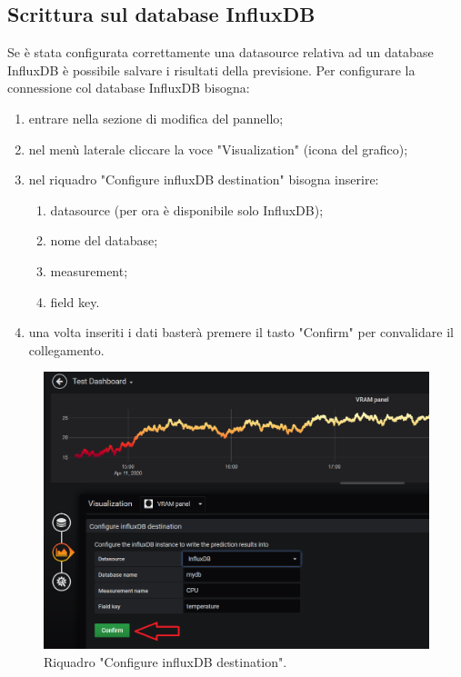     \subsection{Scrittura sul database InfluxDB}
        Se è stata configurata correttamente una datasource relativa ad un database InfluxDB è possibile salvare i risultati della previsione. Per configurare la connessione col database InfluxDB bisogna:
        \begin{enumerate}
            \item entrare nella sezione di modifica del pannello;
            \item nel menù laterale cliccare la voce "Visualization" (icona del grafico);
            \item nel riquadro "Configure influxDB destination" bisogna inserire:
            \begin{enumerate}
                \item datasource (per ora è disponibile solo InfluxDB);
                \item nome del database;
                \item measurement;
                \item field key.
            \end{enumerate}
            \item una volta inseriti i dati basterà premere il tasto "Confirm" per convalidare il collegamento.
        \end{enumerate}
        \begin{figure}[H]
            \includegraphics[width=\textwidth,height=\textheight,keepaspectratio]{img/scrittura_InfluxDB.png}
            \caption{Riquadro "Configure influxDB destination".}
        \end{figure}
